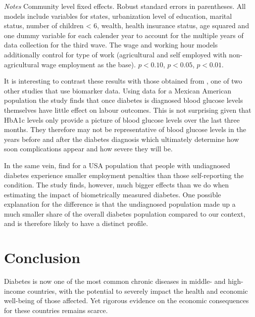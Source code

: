 \documentclass[12pt,english]{article}
\begin{document}
\begin{table}[h]
\begin{center}
\begin{adjustbox}{max width=\linewidth}
\begin{threeparttable}
{\begin{tabular}{l*{6}{S
S}}
\bottomrule
\end{tabular}
\begin{tablenotes}
\item \footnotesize \textit{Notes} Community level fixed effects. Robust standard errors in parentheses. All models include variables for  states, urbanization level of education, marital status, number of children < 6, wealth, health insurance status, age squared and one dummy variable for each calender year to account for the multiple years of data collection for the third wave. The wage and working hour models additionally control for type of work (agricultural and self employed with non-agricultural wage employment as the base). \sym{*} \(p<0.10\), \sym{**} \(p<0.05\), \sym{***} \(p<0.01\).
\end{tablenotes}
}
\end{threeparttable}
\end{adjustbox}
\end{center}
\end{table}


It is interesting to contrast these results with those obtained from \textcite{BrownIII2011}, one of two other studies that use biomarker data. Using data for a Mexican American population the study finds that once diabetes is diagnosed blood glucose levels themselves have little effect on labour outcomes. This is not surprising given that HbA1c levels only provide a picture of blood glucose levels over the last three months. They therefore may not be representative of blood glucose levels in the years before and after the diabetes diagnosis which ultimately determine how soon complications appear and how severe they will be.

In the same vein, \textcite{Minor2015} find for a USA population that people with undiagnosed diabetes experience smaller employment penalties than those self-reporting the condition. The study finds, however, much bigger effects than we do when estimating the impact of biometrically measured diabetes. One possible explanation for the difference is that the undiagnosed population made up a much smaller share of the overall diabetes population compared to our context, and is therefore likely to have a distinct profile.
\FloatBarrier


\section{\label{sec:cha_4_conclusion}Conclusion}

Diabetes is now one of the most common chronic diseases in middle- and high-income countries, with the potential to severely impact the health and economic well-being of those affected. Yet rigorous evidence on the economic consequences for these countries remains scarce.
\end{document}
